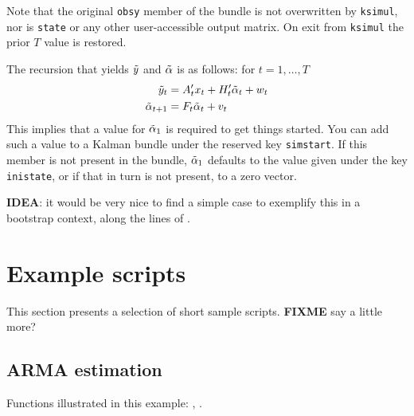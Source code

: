\documentclass[a4paper]{article}
\begin{document}
Note that the original \texttt{obsy} member of the bundle is not
overwritten by \texttt{ksimul}, nor is \texttt{state} or any other
user-accessible output matrix. On exit from \texttt{ksimul} the prior
$T$ value is restored.

The recursion that yields $\tilde{y}$ and $\tilde{\alpha}$
is as follows: for $t=1,\dots,T$
%
\begin{align*}
  \tilde{y}_t &= A_t'x_t + 
   H_t' \tilde{\alpha}_t + w_t  \\ 
  \tilde{\alpha}_{t+1} &= F_t \tilde{\alpha}_t + v_t
\end{align*}
%
This implies that a value for $\tilde{\alpha}_1$ is required to get
things started. You can add such a value to a Kalman bundle under the
reserved key \texttt{simstart}. If this member is not present in the
bundle, $\tilde{\alpha}_1$ defaults to the value given under the
key \texttt{inistate}, or if that in turn is not present, to a zero
vector.


\textbf{IDEA}: it would be very nice to find a simple case to
exemplify this in a bootstrap context, along the lines of 
\cite{stoffer-wall91}.

\section{Example scripts}
\label{sec:examples}

This section presents a selection of short sample
scripts. \textbf{FIXME} say a little more?

\subsection{ARMA estimation}
\label{sec:example_arma}

Functions illustrated in this example: , .
\end{document}
